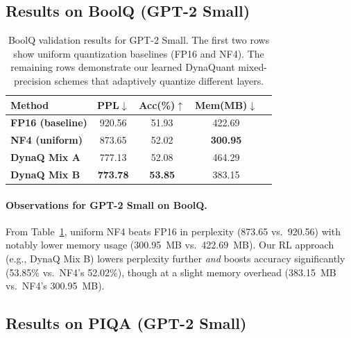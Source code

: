 \documentclass{article}
\begin{document}
	\subsection{Results on BoolQ (GPT-2 Small)}
	
	\begin{table}[ht]
		\centering		
		\label{tab:boolq-small}
		\begin{tabular}{lcccc}
			\toprule
			\textbf{Method} & \textbf{PPL}$\downarrow$ & \textbf{Acc(\%)}$\uparrow$ & \textbf{Mem(MB)}$\downarrow$ \\
			\midrule
			\textbf{FP16 (baseline)}  & 920.56 & 51.93 & 422.69 \\
			\textbf{NF4 (uniform)}    & 873.65 & 52.02 & \textbf{300.95} \\
			\midrule
			\textbf{DynaQ Mix A}      & 777.13 & 52.08 & 464.29 \\
			\textbf{DynaQ Mix B}      & \textbf{773.78} & \textbf{53.85} & 383.15 \\
			\bottomrule
		\end{tabular}
		\caption{\small BoolQ validation results for GPT-2 Small. The first two rows show uniform quantization baselines (FP16 and NF4). The remaining rows demonstrate our learned DynaQuant mixed-precision schemes that adaptively quantize different layers.}
	\end{table}
	
	\paragraph{Observations for GPT-2 Small on BoolQ.}
	From Table~\ref{tab:boolq-small}, uniform NF4 beats FP16 in perplexity (873.65 vs.\ 920.56) with notably lower memory usage (300.95~MB vs.\ 422.69~MB). Our RL approach (e.g., DynaQ Mix B) lowers perplexity further \emph{and} boosts accuracy significantly (53.85\% vs.\ NF4’s 52.02\%), though at a slight memory overhead (383.15~MB vs.\ NF4’s 300.95~MB).
	
	\subsection{Results on PIQA (GPT-2 Small)}
	
\end{document}
